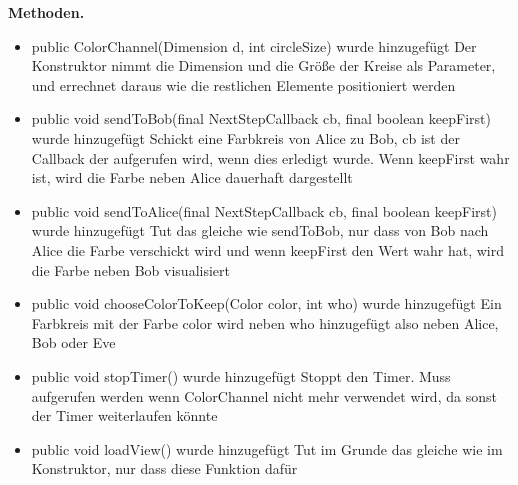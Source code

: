 \documentclass{article}
\begin{document}
    \textbf{Methoden.}\newline
	   \begin{itemize}
           \item public ColorChannel(Dimension d, int circleSize) wurde hinzugefügt\newline
               Der Konstruktor nimmt die Dimension und die Größe der Kreise als Parameter,\newline
               und errechnet daraus wie die restlichen Elemente positioniert werden\newline
           \item public void sendToBob(final NextStepCallback cb, final boolean keepFirst) wurde hinzugefügt\newline
               Schickt eine Farbkreis von Alice zu Bob, cb ist der Callback der aufgerufen wird, wenn dies\newline
               erledigt wurde.\newline
               Wenn keepFirst wahr ist, wird die Farbe neben Alice dauerhaft dargestellt\newline
           \item public void sendToAlice(final NextStepCallback cb, final boolean keepFirst) wurde hinzugefügt\newline
               Tut das gleiche wie sendToBob, nur dass von Bob nach Alice die Farbe verschickt wird und\newline
               wenn keepFirst den Wert wahr hat, wird die Farbe neben Bob visualisiert\newline
           \item public void chooseColorToKeep(Color color, int who) wurde hinzugefügt\newline
               Ein Farbkreis mit der Farbe color wird neben who hinzugefügt also neben Alice, Bob oder Eve\newline
           \item public void stopTimer() wurde hinzugefügt\newline
               Stoppt den Timer. Muss aufgerufen werden wenn ColorChannel nicht mehr verwendet wird,\newline
               da sonst der Timer weiterlaufen könnte\newline
           \item public void loadView() wurde hinzugefügt\newline
               Tut im Grunde das gleiche wie im Konstruktor, nur dass diese Funktion dafür\newline

\end{itemize}
\end{document}
